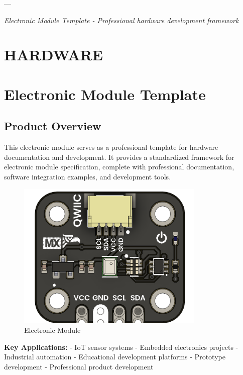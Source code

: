 \documentclass[11pt,a4paper]{article}
\begin{document}
---

\textit{Electronic Module Template - Professional hardware development framework}




\setcounter{section}{0}
\section{HARDWARE}



\setcounter{section}{0}
\section{Electronic Module Template}


\subsection{Product Overview}

This electronic module serves as a professional template for hardware documentation and development. It provides a standardized framework for electronic module specification, complete with professional documentation, software integration examples, and development tools.

\begin{figure}[H]
\centering
\includegraphics[width=0.8\textwidth]{unit_top_v_1_0_0_ue0094_icp10111_barometric_pressure_sensor.png}
\caption{Electronic Module}
\end{figure}

\textbf{Key Applications:}
- IoT sensor systems
- Embedded electronics projects
- Industrial automation
- Educational development platforms
- Prototype development
- Professional product development
\end{document}

